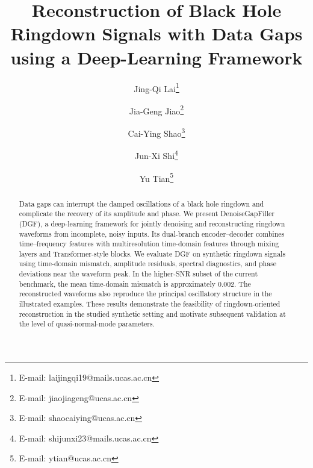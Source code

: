 \documentclass[prd,aps,a4paper,twocolumn,superscriptaddress,nofootinbib,floatfix]{revtex4-2}
\begin{document}
\title{Reconstruction of Black Hole Ringdown Signals with Data Gaps using a Deep-Learning Framework}
\author{Jing-Qi Lai\footnote{E-mail: laijingqi19@mails.ucas.ac.cn}}
\author{Jia-Geng Jiao\footnote{E-mail: jiaojiageng@ucas.ac.cn}}
\author{Cai-Ying Shao\footnote{E-mail: shaocaiying@ucas.ac.cn}}

\author{Jun-Xi Shi\footnote{E-mail: shijunxi23@mails.ucas.ac.cn}}
\author{Yu Tian\footnote{E-mail:  ytian@ucas.ac.cn}}

\begin{abstract}
Data gaps can interrupt the damped oscillations of a black hole ringdown and complicate the recovery of its amplitude and phase. We present DenoiseGapFiller (DGF), a deep-learning framework for jointly denoising and reconstructing ringdown waveforms from incomplete, noisy inputs. Its dual-branch encoder--decoder combines time--frequency features with multiresolution time-domain features through mixing layers and Transformer-style blocks. We evaluate DGF on synthetic ringdown signals using time-domain mismatch, amplitude residuals, spectral diagnostics, and phase deviations near the waveform peak. In the higher-SNR subset of the current benchmark, the mean time-domain mismatch is approximately $0.002$. The reconstructed waveforms also reproduce the principal oscillatory structure in the illustrated examples. These results demonstrate the feasibility of ringdown-oriented reconstruction in the studied synthetic setting and motivate subsequent validation at the level of quasi-normal-mode parameters.

\end{abstract}
\end{document}
